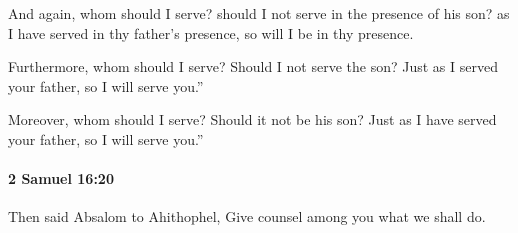 			\begin{versebox}
					\item[BHS] 
					\item[ASV] And again, whom should I serve? should I not serve in the presence of his son? as I have served in thy father's presence, so will I be in thy presence.
					\item[NIV] Furthermore, whom should I serve? Should I not serve the son? Just as I served your father, so I will serve you.”
					\item[NRSV] Moreover, whom should I serve? Should it not be his son? Just as I have served your father, so I will serve you.”
			\end{versebox}

		\paragraph{2 Samuel 16:20} %
			\label{2SAMUEL-16-20}

			Then said Absalom to Ahithophel, Give counsel among you what we shall do.

